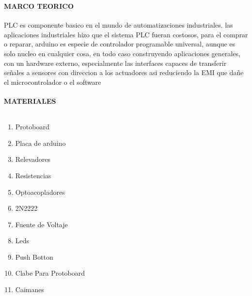 \documentclass[12pt]{report}
\begin{document}
{\huge \textbf{MARCO TEORICO}\\}\\


{\large PLC es componente basico en el mundo de automatizaciones industriales. las
aplicaciones industriales hizo que el sistema PLC fueran costosos, para el comprar
o reparar, arduino es especie de controlador programable universal, aunque
es solo nucleo en cualquier cosa, en todo caso construyendo aplicaciones generales,
con un hardware externo, especialmente las interfaces capaces de transferir
señales a sensores con direccion a los actuadores asi reduciendo la EMI que 
dañe el microcontrolador o el software\\}\\


{\huge \textbf{MATERIALES}\\}\\


\begin{enumerate}
\item Protoboard
\item Placa de arduino
\item Relevadores
\item Resistencias
\item Optoacopladores
\item 2N2222
\item Fuente de Voltaje
\item Leds
\item Push Botton
\item Clabe Para Protoboard
\item Caimanes
\end{enumerate}
\end{document}
